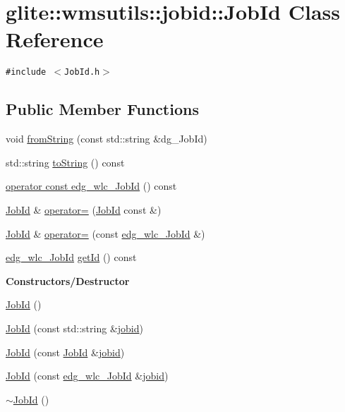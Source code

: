 \hypertarget{classglite_1_1wmsutils_1_1jobid_1_1JobId}{
\section{glite::wmsutils::jobid::Job\-Id Class Reference}
\label{classglite_1_1wmsutils_1_1jobid_1_1JobId}
}
{\tt \#include $<$Job\-Id.h$>$}

\subsection*{Public Member Functions}
\begin{CompactItemize}
\item 
void \hyperlink{classglite_1_1wmsutils_1_1jobid_1_1JobId_a0}{from\-String} (const std::string \&dg\_\-Job\-Id)
\item 
std::string \hyperlink{classglite_1_1wmsutils_1_1jobid_1_1JobId_a1}{to\-String} () const 
\item 
\hyperlink{classglite_1_1wmsutils_1_1jobid_1_1JobId_a2}{operator const edg\_\-wlc\_\-Job\-Id} () const 
\item 
\hyperlink{classglite_1_1wmsutils_1_1jobid_1_1JobId}{Job\-Id} \& \hyperlink{classglite_1_1wmsutils_1_1jobid_1_1JobId_a3}{operator=} (\hyperlink{classglite_1_1wmsutils_1_1jobid_1_1JobId}{Job\-Id} const \&)
\item 
\hyperlink{classglite_1_1wmsutils_1_1jobid_1_1JobId}{Job\-Id} \& \hyperlink{classglite_1_1wmsutils_1_1jobid_1_1JobId_a4}{operator=} (const \hyperlink{cjobid_8h_a2}{edg\_\-wlc\_\-Job\-Id} \&)
\item 
\hyperlink{cjobid_8h_a2}{edg\_\-wlc\_\-Job\-Id} \hyperlink{classglite_1_1wmsutils_1_1jobid_1_1JobId_a5}{get\-Id} () const 
\end{CompactItemize}
\begin{Indent}{\bf Constructors/Destructor}\par
\begin{CompactItemize}
\item 
\hyperlink{classglite_1_1wmsutils_1_1jobid_1_1JobId_z1_0}{Job\-Id} ()
\item 
\hyperlink{classglite_1_1wmsutils_1_1jobid_1_1JobId_z1_1}{Job\-Id} (const std::string \&\hyperlink{classjobid}{jobid})
\item 
\hyperlink{classglite_1_1wmsutils_1_1jobid_1_1JobId_z1_2}{Job\-Id} (const \hyperlink{classglite_1_1wmsutils_1_1jobid_1_1JobId}{Job\-Id} \&\hyperlink{classjobid}{jobid})
\item 
\hyperlink{classglite_1_1wmsutils_1_1jobid_1_1JobId_z1_3}{Job\-Id} (const \hyperlink{cjobid_8h_a2}{edg\_\-wlc\_\-Job\-Id} \&\hyperlink{classjobid}{jobid})
\item 
\hyperlink{classglite_1_1wmsutils_1_1jobid_1_1JobId_z1_4}{$\sim$Job\-Id} ()
\end{CompactItemize}
\end{Indent}
